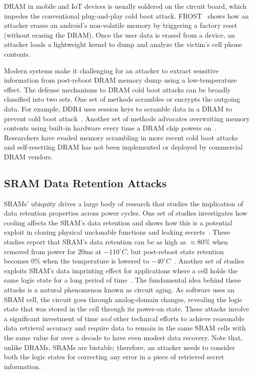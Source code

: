 DRAM in mobile and IoT devices is usually soldered on the circuit board, which impedes the conventional plug-and-play cold boot attack. 
FROST~\cite{frost_2013} shows how an attacker erases an android's non-volatile memory by triggering a factory reset (without erasing the DRAM). 
Once the user data is erased from a device, an attacker loads a lightweight kernel to dump and analyze the victim's cell phone contents.


Modern systems make it challenging for an attacker to extract sensitive information from post-reboot DRAM memory dump using a low-temperature effect.
The defense mechanisms to DRAM cold boot attacks can be broadly classified into two sets. One set of methods scrambles or encrypts the outgoing data.
For example, DDR4 uses session keys to scramble data in a DRAM to prevent cold boot attack~\cite{yitbarek_cold_2017}.
Another set of methods advocates overwriting memory contents using built-in hardware every time a DRAM chip powers on~\cite{codic,8862904}.
Researchers have evaded memory scrambling in more recent cold boot attacks~\cite{yitbarek_cold_2017} and self-resetting DRAM has not been implemented or deployed by commercial DRAM vendors. 

\subsection{SRAM Data Retention Attacks}

SRAMs' ubiquity drives a large body of research that studies the implication of data retention properties across power cycles. 
One set of studies investigates how cooling affects the SRAM's data retention and shows how this is a potential exploit in cloning physical unclonable functions and leaking secrets~\cite{anagnostopoulos2018low,anagnostopoulos2019attacking,skorobogatov2002low,gutmann2001data,cakir20126t}.
These studies report that SRAM's data retention can be as high as $\approx$80\%  when removed from power for 20ms at $-110^\circ C$,  but post-reboot state retention becomes 0\% when the temperature is lowered to $-40^\circ C$~\cite{anagnostopoulos2018low}. 
Another set of studies exploits SRAM's data imprinting effect for applications where a cell holds the same logic state for a long period of time~\cite{williams2020silicon,cakir20126t,liu2016sram,maiti2011impact}.
The fundamental idea behind these attacks is a natural phenomenon known as circuit aging. 
As software uses an SRAM cell, the circuit goes through analog-domain changes, revealing the logic state that was stored in the cell through its power-on state. 
These attacks involve a significant investment of time \textit{and} other technical efforts to achieve reasonable data retrieval accuracy and require data to remain in the same SRAM cells with the same value for over a decade to have even modest data recovery.
Note that, unlike DRAMs, SRAMs are bistable; therefore, an attacker needs to consider both the logic states for correcting any error in a piece of retrieved secret information. 
